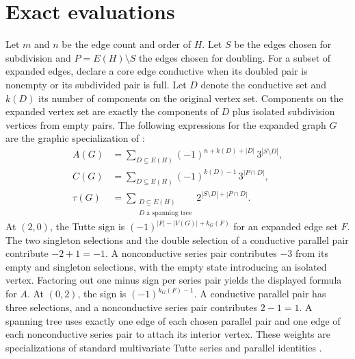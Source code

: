 \documentclass[11pt]{article}
\begin{document}
\newpage
\section{Exact evaluations}
Let \(m\) and \(n\) be the edge count and order of \(H\). Let \(S\)
be the edges chosen for subdivision and \(P=E(H)\setminus S\)
the edges chosen for doubling. For a subset of expanded edges,
declare a core edge conductive when its doubled pair is nonempty
or its subdivided pair is full. Let \(D\) denote the conductive set
and \(k(D)\) its number of components on the original vertex set.
Components on the expanded vertex set are exactly the components
of \(D\) plus isolated subdivision vertices from empty pairs.
The following expressions for the expanded graph \(G\) are the
graphic specialization of \cite[Proposition 3]{kmm}:
\begin{align*}
 A(G) &= \sum_{D\subseteq E(H)}(-1)^{n+k(D)+|D|}\,3^{|S\setminus D|},\\
 C(G) &= \sum_{D\subseteq E(H)}(-1)^{k(D)-1}\,3^{|P\cap D|},\\
 \tau(G)&=\sum_{\substack{D\subseteq E(H)\\D\text{ a spanning tree}}}
                         2^{|S\setminus D|+|P\cap D|}.
\end{align*}
At \((2,0)\), the Tutte sign is \((-1)^{|F|-|V(G)|+k_G(F)}\)
for an expanded edge set \(F\). The two singleton selections and
the double selection of a conductive parallel pair contribute
\(-2+1=-1\). A nonconductive series pair contributes \(-3\)
from its empty and singleton selections, with the empty state
introducing an isolated vertex. Factoring out one minus sign per
series pair yields the displayed formula for \(A\).
At \((0,2)\), the sign is \((-1)^{k_G(F)-1}\). A conductive
parallel pair has three selections, and a nonconductive series
pair contributes \(2-1=1\). A spanning tree uses exactly one
edge of each chosen parallel pair and one edge of each
nonconductive series pair to attach its interior vertex.
These weights are specializations of standard multivariate Tutte
series and parallel identities \cite{sokal}.
\end{document}
